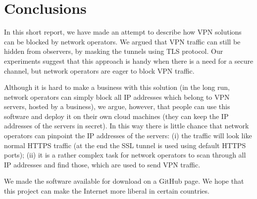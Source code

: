 \section{Conclusions}
\label{section:conclusion}

In this short report, we have made an attempt to describe how VPN 
solutions can be blocked by network operators. We argued that VPN 
traffic can still be hidden from observers, by masking the tunnels 
using TLS protocol. Our experiments suggest that this approach is 
handy when there is a need for a secure channel, but network operators 
are eager to block VPN traffic.

Although it is hard to make a business with this solution (in the long 
run, network operators can simply block all IP addresses which belong 
to VPN servers, hosted by a business), we argue, however, that people 
can use this software and deploy it on their own cloud machines (they 
can keep the IP addresses of the servers in secret). In this way there 
is little chance that network operators can pinpoint the IP addresses of the 
servers: (i) the traffic will look like normal HTTPS traffic (at the end
the SSL tunnel is used using default HTTPS ports); (ii) it is a rather 
complex task for network operators to scan through all IP addresses and 
find those, which are used to send VPN traffic.

We made the software available for download on a GitHub page. We hope that 
this project can make the Internet more liberal in certain countries.
